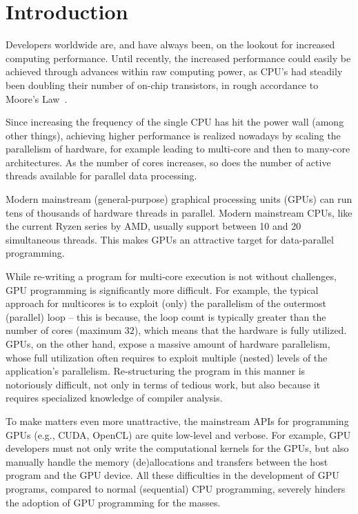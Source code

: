 \chapter{Introduction}

Developers worldwide are, and have always been, on the lookout 
for increased computing performance.
Until recently, the increased performance could easily be
achieved through advances within raw computing power, as CPU's had steadily been
doubling their number of on-chip transistors, in rough accordance to Moore's
Law~\cite{MooresLaw}.

Since increasing the frequency of the single CPU has hit the power
wall\cite{Dubois:ParCompDesign} (among other things), achieving higher performance 
is realized nowadays by scaling the parallelism of hardware, for example
leading to multi-core and then to many-core architectures.
As the number of cores increases, so does the number of
active threads available for parallel data processing.

Modern mainstream (general-purpose) graphical processing units (GPUs) can run 
tens of thousands of hardware threads in parallel. Modern mainstream CPUs, 
like the current Ryzen series by AMD, usually support between 10 and 20 
simultaneous threads. This makes GPUs an attractive target for data-parallel 
programming.

While re-writing a program for multi-core execution is not without challenges,
GPU programming is significantly more difficult. For example, the typical
approach for multicores is to exploit (only) the parallelism of the outermost
(parallel) loop -- this is because, the loop count is typically greater than 
the number of cores (maximum $32$), which means that the hardware
is fully utilized. GPUs, on the other hand, expose a massive amount of hardware
parallelism, whose full utilization often requires to exploit multiple (nested)
levels of the application's parallelism. Re-structuring the program in this
manner is notoriously difficult, not only in terms of tedious work, but also
because it requires specialized knowledge of compiler analysis.

To make matters even more unattractive, the mainstream APIs for programming
GPUs (e.g., CUDA, OpenCL) are quite low-level and verbose.  For example, GPU
developers must not only write the computational kernels for the GPUs, but 
also manually handle the memory (de)allocations and transfers between the host 
program and the GPU device.  All these difficulties in the development of GPU 
programs, compared to normal (sequential) CPU programming, severely hinders 
the adoption of GPU programming for the masses.

